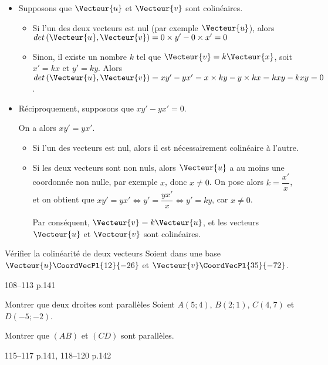 \documentclass[a4paper]{article}
\begin{document}
\begin{demonstrationp}{}{}
  \begin{itemize}
    \item Supposons que $\Vecteur{u}$ et $\Vecteur{v}$ sont colinéaires.
    \begin{itemize}
      \item Si l'un des deux vecteurs est nul (par exemple $\Vecteur{u}$), alors $det\left(\Vecteur{u},\Vecteur{v}\right)=0\times y'-0 \times x'=0$
      \item Sinon, il existe un nombre $k$ tel que $\Vecteur{v}=k\Vecteur{x}$, soit $x'=kx$ et $y'=ky$. Alors $det\left(\Vecteur{u},\Vecteur{v}\right)=xy'-yx'=x\times ky-y\times kx=kxy-kxy=0$.
    \end{itemize}

    \item Réciproquement, supposons que $xy'-yx'=0$.
    
    On a alors $xy'=yx'$. 
    \begin{itemize}
      \item Si l'un des vecteurs est nul, alors il est nécessairement colinéaire à l'autre.
      \item Si les deux vecteurs sont non nuls, alors $\Vecteur{u}$ a au moins une coordonnée non nulle, par exemple $x$, donc $x\neq0$.
        On pose alors $k=\dfrac{x'}{x}$, et on obtient que $xy'=yx' \iff y'=\dfrac{yx'}{x} \iff y'=ky$, car $x\neq 0$.

        Par conséquent, $\Vecteur{v}=k\Vecteur{u}$, et les vecteurs $\Vecteur{u}$ et $\Vecteur{v}$ sont colinéaires.
    \end{itemize}
  \end{itemize}

\end{demonstrationp}

\begin{methode*}{Vérifier la colinéarité de deux vecteurs}{}
  Soient dans une base $\Vecteur{u}\CoordVecPl{12}{-26}$ et $\Vecteur{v}\CoordVecPl{35}{-72}$.

 
  \hfill{}
\end{methode*}


\begin{exercices}{}{}
  108--113 p.141
\end{exercices}

\begin{methode*}{Montrer que deux droites sont parallèles}{}
   Soient $A(5;4)$, $B(2;1)$, $C(4,7)$ et $D(-5;-2)$.
   
   Montrer que $(AB)$ et $(CD)$ sont parallèles.


   \vspace{4.5cm}
 
   \hfill{}
 \end{methode*}

\begin{exercices}{}{}
  115--117 p.141, 118--120 p.142
\end{exercices}


  
\end{document}
